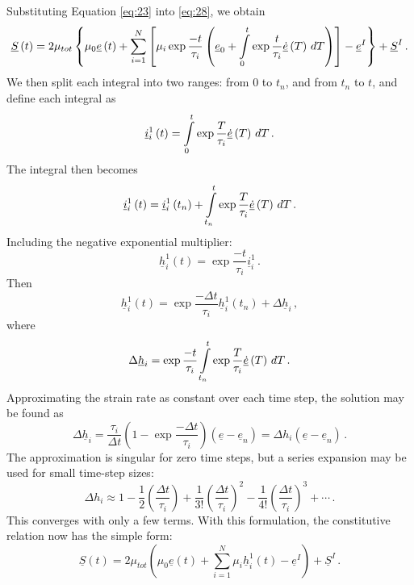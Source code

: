 Substituting Equation \ref{eq:23} into \ref{eq:28}, we obtain
\begin{equation}
\underline{S}\left(t\right)=2\mu_{tot}\left\{ \mu_{0}\underline{e}\left(t\right)+\sum_{i=1}^{N}\left[\mu_{i}\exp\frac{-t}{\tau_{i}}\left(\underline{e}_{0}+\intop_{0}^{t}\exp\frac{t}{\tau_{i}}\underline{\dot{e}}\left(T\right)\, dT\right)\right]-\underline{e}^{I}\right\} +\underline{S}^{I}\,.\label{eq:29}
\end{equation}
We then split each integral into two ranges: from 0 to $t_{n}$, and
from $t_{n}$ to $t$, and define each integral as
\begin{equation}
\underline{i}_{i}^{1}\left(t\right)=\intop_{0}^{t}\exp\frac{T}{\tau_{i}}\underline{\dot{e}}\left(T\right)\, dT\,.\label{eq:30}
\end{equation}
The integral then becomes
\begin{equation}
\underline{i}_{i}^{1}\left(t\right)=\underline{i}_{i}^{1}\left(t_{n}\right)+\intop_{t_{n}}^{t}\exp\frac{T}{\tau_{i}}\underline{\dot{e}}\left(T\right)\, dT\,.\label{eq:31}
\end{equation}
Including the negative exponential multiplier:
\begin{equation}
\underline{h}_{i}^{1}\left(t\right)=\exp\frac{-t}{\tau_{i}}\underline{i}_{i}^{1}\,.\label{eq:32}
\end{equation}
Then
\begin{equation}
\underline{h}_{i}^{1}\left(t\right)=\exp\frac{-\Delta t}{\tau_{i}}\underline{h}_{i}^{1}\left(t_{n}\right)+\Delta\underline{h}_{i}\,,\label{eq:33}
\end{equation}
where
\begin{equation}
\Delta\underline{h}_{i}=\exp\frac{-t}{\tau_{i}}\intop_{t_{n}}^{t}\exp\frac{T}{\tau_{i}}\underline{\dot{e}}\left(T\right)\, dT\,.\label{eq:34}
\end{equation}
Approximating the strain rate as constant over each time step, the
solution may be found as
\begin{equation}
\Delta\underline{h}_{i}=\frac{\tau_{i}}{\Delta t}\left(1-\exp\frac{-\Delta t}{\tau_{i}}\right)\left(\underline{e}-\underline{e}_{n}\right)=\Delta h_{i}\left(\underline{e}-\underline{e}_{n}\right)\,.\label{eq:35}
\end{equation}
The approximation is singular for zero time steps, but a series expansion
may be used for small time-step sizes:
\begin{equation}
\Delta h_{i}\approx1-\frac{1}{2}\left(\frac{\Delta t}{\tau_{i}}\right)+\frac{1}{3!}\left(\frac{\Delta t}{\tau_{i}}\right)^{2}-\frac{1}{4!}\left(\frac{\Delta t}{\tau_{i}}\right)^{3}+\cdots\,.\label{eq:36}
\end{equation}
This converges with only a few terms. With this formulation, the constitutive
relation now has the simple form:
\begin{equation}
\underline{S}\left(t\right)=2\mu_{tot}\left(\mu_{0}\underline{e}\left(t\right)+\sum_{i=1}^{N}\mu_{i}\underline{h}_{i}^{1}\left(t\right)-\underline{e}^{I}\right)+\underline{S}^{I}\,.\label{eq:37}
\end{equation}


